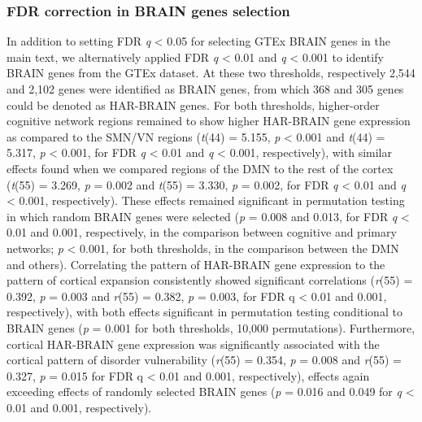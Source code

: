 \begin{refsection}
\subsubsection*{FDR correction in BRAIN genes selection}
In addition to setting FDR \textit{q} < 0.05 for selecting GTEx BRAIN genes in the main text, we alternatively applied FDR \textit{q} < 0.01 and \textit{q} < 0.001 to identify BRAIN genes from the GTEx dataset. At these two thresholds, respectively 2,544 and 2,102 genes were identified as BRAIN genes, from which 368 and 305 genes could be denoted as HAR-BRAIN genes. For both thresholds, higher-order cognitive network regions remained to show higher HAR-BRAIN gene expression as compared to the SMN/VN regions (\textit{t}(44) = 5.155, \textit{p} < 0.001 and \textit{t}(44) = 5.317, \textit{p} < 0.001, for FDR \textit{q} < 0.01 and \textit{q} < 0.001, respectively), with similar effects found when we compared regions of the DMN to the rest of the cortex (\textit{t}(55) = 3.269, \textit{p} = 0.002 and \textit{t}(55) = 3.330, \textit{p} = 0.002, for FDR \textit{q} < 0.01 and \textit{q} < 0.001, respectively). These effects remained significant in permutation testing in which random BRAIN genes were selected (\textit{p} = 0.008 and 0.013, for FDR \textit{q} < 0.01 and 0.001, respectively, in the comparison between cognitive and primary networks; \textit{p} < 0.001, for both thresholds, in the comparison between the DMN and others). Correlating the pattern of HAR-BRAIN gene expression to the pattern of cortical expansion consistently showed significant correlations (\textit{r}(55) = 0.392, \textit{p} = 0.003 and \textit{r}(55) = 0.382, \textit{p} = 0.003, for FDR q < 0.01 and 0.001, respectively), with both effects significant in permutation testing conditional to BRAIN genes (\textit{p} = 0.001 for both thresholds, 10,000 permutations). Furthermore, cortical HAR-BRAIN gene expression was significantly associated with the cortical pattern of disorder vulnerability (\textit{r}(55) = 0.354, \textit{p} = 0.008 and \textit{r}(55) = 0.327, \textit{p} = 0.015 for FDR q < 0.01 and 0.001, respectively), effects again exceeding effects of randomly selected BRAIN genes (\textit{p} = 0.016 and 0.049 for \textit{q} < 0.01 and 0.001, respectively).


\end{refsection}

